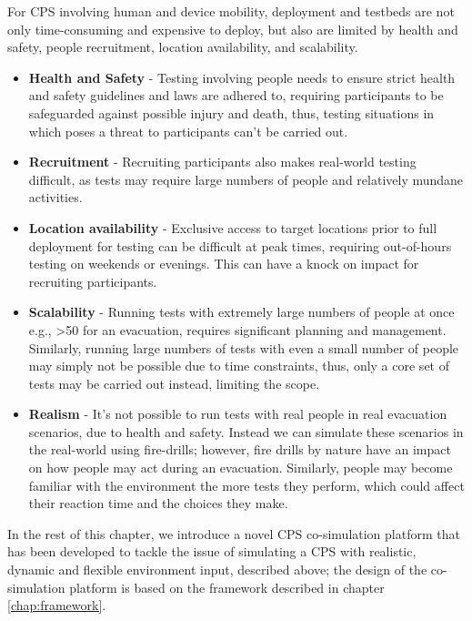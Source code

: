For CPS involving human and device mobility, deployment and testbeds are not only time-consuming and expensive to deploy, but also are limited by health and safety, people recruitment, location availability, and scalability. 
\begin{itemize}
  \item \textbf{Health and Safety} - Testing involving people needs to ensure strict health and safety guidelines and laws are adhered to, requiring participants to be safeguarded against possible injury and death, thus, testing situations in which poses a threat to participants can't be carried out. 

  \item \textbf{Recruitment} - Recruiting participants also makes real-world testing difficult, as tests may require large numbers of people and relatively mundane activities. 

  \item \textbf{Location availability} - Exclusive access to target locations prior to full deployment for testing can be difficult at peak times, requiring out-of-hours testing on weekends or evenings. This can have a knock on impact for recruiting participants.

  \item \textbf{Scalability} - Running tests with extremely large numbers of people at once e.g., >50 for an evacuation, requires significant planning and management. Similarly, running large numbers of tests with even a small number of people may simply not be possible due to time constraints, thus, only a core set of tests may be carried out instead, limiting the scope.

  \item \textbf{Realism} - It's not possible to run tests with real people in real evacuation scenarios, due to health and safety. Instead we can simulate these scenarios in the real-world using fire-drills; however, fire drills by nature have an impact on how people may act during an evacuation. Similarly, people may become familiar with the environment the more tests they perform, which could affect their reaction time and the choices they make. 
\end{itemize}


In the rest of this chapter, we introduce a novel CPS co-simulation platform that has been developed to tackle the issue of simulating a CPS with realistic, dynamic and flexible environment input, described above; the design of the co-simulation platform is based on the framework described in chapter \ref{chap:framework}.


